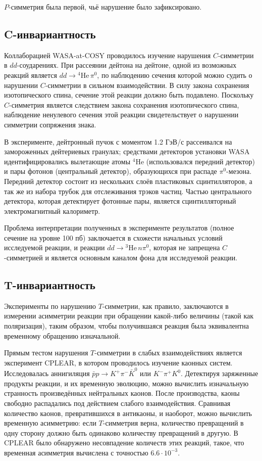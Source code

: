 \documentclass[14pt]{extarticle}
\begin{document}
$P$-симметрия была первой, чьё нарушение было зафиксировано.

\subsection{C-инвариантность}

Коллаборацией WASA-at-COSY проводилось изучение нарушения $C$-симметрии в $dd$-соударениях. \cite{WASA-at-COSY_Hepi} 
%
При рассеянии дейтона на дейтоне, одной из возможных реакций является $dd \to {^4}\mathrm{He}\,\pi^0$, по наблюдению сечения которой можно судить о нарушении $C$-симметрии в сильном взаимодействии. В силу закона сохранения изотопического спина, сечение этой реакции должно быть подавлено. Поскольку $C$-симметрия является следствием закона сохранения изотопического спина, наблюдение ненулевого сечения этой реакции свидетельствует о нарушении симметрии сопряжения знака.

В эксперименте, дейтронный пучок с моментом 1.2 ГэВ/с рассеивался на замороженных дейтериевых гранулах; средствами детекторов установки WASA идентифицировались вылетающие атомы ${^4\mathrm{He}}$ (использовался передний детектор) и пары фотонов (центральный детектор), образующихся при распаде $\pi^0$-мезона. Передний детектор состоит из нескольких слоёв пластиковых сцинтилляторов, а так же из набора трубок для отслеживания трэков частиц. Частью центрального детектора, которая детектирует фотонные пары, является сцинтилляторный электромагнитный калориметр.~\cite{WASA-at-COSY-Henpi}

Проблема интерпретации полученных в эксперименте результатов (полное сечение на уровне 100 пб) заключается в схожести начальных условий исследуемой реакции, и реакции $dd \to {^3}\mathrm{He}\,n\pi^0$, которая не запрещена $C$-симметрией и является основным каналом фона для исследуемой реакции. 

\subsection{T-инвариантность}

Эксперименты по нарушению $T$-симметрии, как правило, заключаются в измерении асимметрии реакции при обращении какой-либо величины (такой как поляризация), таким образом, чтобы получившаяся реакция была эквивалентна временному обращению изначальной.

Прямым тестом нарушения $T$-симметрии в слабых взаимодействиях является эксперимент CPLEAR, в котором проводилось изучение каонных систем.~\cite{CPLEAR} Исследовалась аннигиляция $\bar{p}p \to K^+ \pi^- \bar{K}^0$ или $K^- \pi^+ K^0$. Детектируя заряженные продукты реакции, и их временную эволюцию, можно вычислить изначальную странность произведённых нейтральных каонов. После производства, каоны свободно распадались под действием слабого взаимодействия. Сравнивая количество каонов, превратившихся в антикаоны, и наоборот, можно вычислить временную асимметрию: если $T$-симметрия верна, количество превращений в одну сторону должно быть одинаково количеству превращений в другую.
%
В CPLEAR было обнаружено несовпадение количеств этих реакций, такое, что временная асимметрия вычислена с точностью $6.6\cdot 10^{-3}$.
\end{document}

